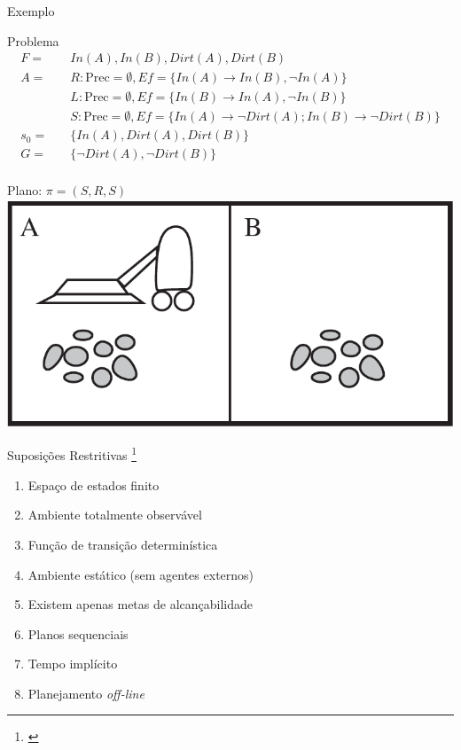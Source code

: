 \begin{frame}{Exemplo}
     \begin{block}{Problema}
        \begin{align*}
                F = \quad  & In(A),In(B),Dirt(A),Dirt(B) \\
                A = \quad  & R: \text{Prec} = \emptyset, Ef= \{ In(A) \rightarrow In(B),\lnot In(A) \} \\
                           & L: \text{Prec} = \emptyset, Ef= \{ In(B) \rightarrow In(A),\lnot In(B) \} \\
                           & S: \text{Prec} = \emptyset, Ef= \{ In(A)  \rightarrow \lnot Dirt(A); In(B) \rightarrow \lnot Dirt(B) \} \\
              s_0 = \quad  & \{ In(A), Dirt(A), Dirt(B)  \} \\
                G = \quad  & \{ \lnot Dirt(A),\lnot Dirt(B)  \} \\
        \end{align*}
    \end{block}
    
        \begin{multicols}{2}
            \centering
             Plano: $\pi = (S,R,S)$\\
        \columnbreak
            \includegraphics[scale=0.18]{images/vaccum_cleaner.png}
        \end{multicols}
    
\end{frame}



\begin{frame}{Suposições Restritivas \footnote{\cite{Ghallab:2004}}}
    \begin{enumerate}
        \item Espaço de estados finito 
        \item Ambiente totalmente observável \label{A:1}
        \item Função de transição determinística 
        \item Ambiente estático (sem agentes externos)
        \item Existem apenas metas de alcançabilidade 
        \item Planos sequenciais
        \item Tempo implícito
        \item Planejamento \textit{off-line}
    \end{enumerate}
    
\end{frame}

